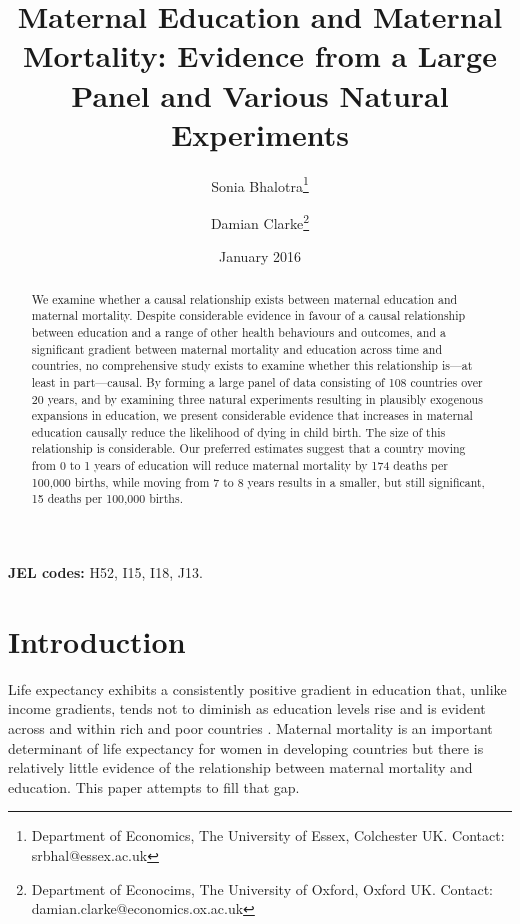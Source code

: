 \documentclass{article}[12pt,subeqn]
\title{Maternal Education and Maternal Mortality: 
Evidence from a Large Panel and Various Natural Experiments}
\author{Sonia Bhalotra\thanks{Department of Economics, The University of Essex,
    Colchester UK. Contact: srbhal@essex.ac.uk}
  \and{Damian Clarke\thanks{Department of Econocims, The University of Oxford,
      Oxford UK. Contact: damian.clarke@economics.ox.ac.uk}}}
\date{January 2016}
\begin{document}
\begin{spacing}{1.4}

\maketitle

\begin{abstract}
We examine whether a causal relationship exists between maternal education and 
maternal mortality. Despite considerable evidence in favour of a causal 
relationship between education and a range of other health behaviours and 
outcomes, and a significant gradient between maternal mortality and education 
across time and countries, no comprehensive study exists to examine whether this 
relationship is---at least in part---causal.  By forming a large panel of data 
consisting of 108 countries over 20 years, and by examining three natural 
experiments resulting in plausibly exogenous expansions in education, we present 
considerable evidence that increases in maternal education causally reduce the 
likelihood of dying in child birth.  The size of this relationship is 
considerable.  Our preferred estimates suggest that a country moving from 0 to 1 
years of education will reduce maternal mortality by 174 deaths per 100,000 
births, while moving from 7 to 8 years results in a smaller, but still 
significant, 15 deaths per 100,000 births.
\end{abstract}
\hspace{8mm} \textbf{JEL codes:} H52, I15, I18, J13.

\newpage
\section{Introduction}
Life expectancy exhibits a consistently positive gradient in education that, 
unlike income gradients, tends not to diminish as education levels rise and is 
evident across and within rich and poor countries \citep{RichardsBarry1998, 
KunstMackenbach1994, EloPreston1996, LlerasMuney2005, Mearaetal2008}. Maternal 
mortality is an important determinant of life expectancy for women in developing 
countries but there is relatively little evidence of the relationship between
maternal mortality and education. This paper attempts to fill that gap.


\end{spacing}
\end{document}
